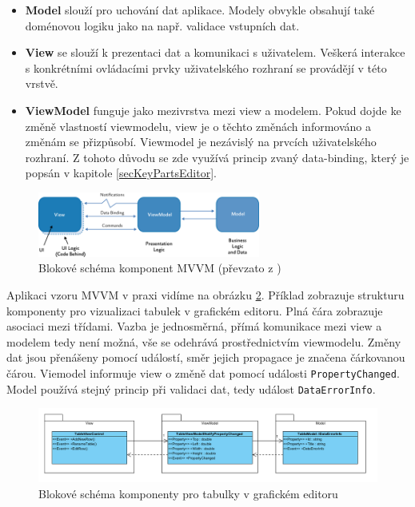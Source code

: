 \documentclass[czech,bachelor,public,dept460,male,oneside]{diploma}
\begin{document}
	\begin{itemize}
		\item \textbf{Model} slouží pro uchování dat aplikace. Modely obvykle obsahují také doménovou logiku jako na např. validace vstupních dat.
		
		\item \textbf{View} se slouží k prezentaci dat a komunikaci s uživatelem. Veškerá interakce s konkrétními ovládacími prvky uživatelského rozhraní se provádějí v této vrstvě. 
		
		\item \textbf{ViewModel} funguje jako mezivrstva mezi view a modelem. Pokud dojde ke změně vlastností viewmodelu, view je o těchto změnách informováno a změnám se přizpůsobí. Viewmodel je nezávislý na prvcích uživatelského rozhraní. Z tohoto důvodu se zde využívá princip zvaný data-binding, který je popsán v kapitole \ref{secKeyPartsEditor}. 
	\end{itemize}
	
	\begin{figure}[!h]
		\centering
		\includegraphics[width=0.65\textwidth]{Figures/Mvvm}
		\caption[Blokové schéma komponent MVVM]{Blokové schéma komponent MVVM (převzato z \cite{mvvm})}
		\label{fig:mvvm}
	\end{figure}
	
	Aplikaci vzoru MVVM v praxi vidíme na obrázku \ref{fig:mvvmUsage}. Příklad zobrazuje strukturu komponenty pro vizualizaci tabulek v grafickém editoru. Plná čára zobrazuje asociaci mezi třídami. Vazba je jednosměrná, přímá komunikace mezi view a modelem tedy není možná, vše se odehrává prostřednictvím viewmodelu. Změny dat jsou přenášeny pomocí událostí, směr jejich propagace je značena čárkovanou čárou. Viemodel informuje view o změně dat pomocí události \texttt{PropertyChanged}. Model používá stejný princip při validaci dat, tedy událost \texttt{DataErrorInfo}.
	
	\begin{figure}[H]
		\centering
		\includegraphics[width=1\textwidth]{Figures/EditorMvvm}
		\caption[Blokové schéma komponenty pro tabulky v grafickém editoru]{Blokové schéma komponenty pro tabulky v grafickém editoru}
		\label{fig:mvvmUsage}
	\end{figure}
	
\end{document}
